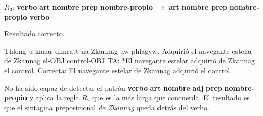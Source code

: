 \begin{enumerate}
\begin{example}
\end{example} $R_3$: \textbf{verbo} \textbf{art} \textbf{nombre} \textbf{prep} \textbf{nombre-propio} $\rightarrow$ \textbf{art} \textbf{nombre} \textbf{prep} \textbf{nombre-propio} \textbf{verbo} 

Resultado correcto. 

\begin{example} \gll Thlong u knaar qimratt na Zkannag uw phlagyw. {Adquirió} el navegante estelar de Zkannag el-OBJ control-OBJ \glt TA: *El navegante estelar adquirió de Zkannag el control. \glt Correcta: El navegante estelar de Zkannag adquirió el control. \glend

\end{example} 

No ha sido capaz de detectar el patrón \textbf{verbo} \textbf{art} \textbf{nombre} \textbf{adj} \textbf{prep} \textbf{nombre-propio} y aplica la regla $R_2$ que es la más larga que concuerda. El resultado es que el sintagma preposicional \emph{de Zkannag} queda detrás del verbo. 


\end{enumerate}
